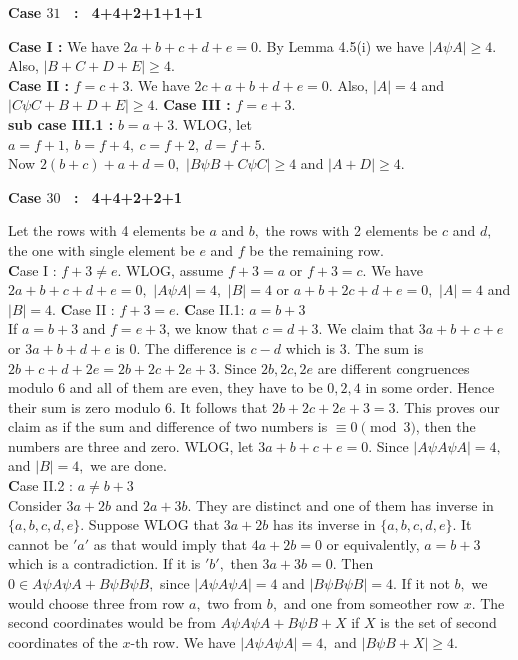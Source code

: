 \documentclass[reqno,10pt]{amsart}
\begin{document}
\begin{center}
 \textbf{Case $31$ \ : \ 4+4+2+1+1+1}
 \end{center}
\textbf {Case I : } We have $2a+b+c+d+e = 0.$ By Lemma 4.5(i) we have
$|A\psi A| \geq 4.$ Also, $|B+C+D+E| \geq 4.$\\
\textbf {Case II : } $f=c+3.$ We have $2c+a+b+d+e=0.$ Also, $|A|=4$ and
$|C\psi C+B+D+E| \geq 4.$
\textbf {Case III : } $f=e+3.$\\
\textbf{sub case III.1 :} $b=a+3.$ WLOG, let $a=f+1, \ b= f+4, \ c=f+2, \ d=f+5.$\\
Now $2(b+c)+a+d =0,$ $|B \psi B + C \psi C| \geq 4$ and $|A+D| \geq 4.$
\\
\begin{center}
\textbf{Case $30$ \ : \ 4+4+2+2+1}
\end{center}
Let  the rows with 4 elements be $a$ and $b,$ the rows with 2 elements be $c$ and $d,$ the one with single element be $e$ and $f$ be the remaining row.\\ 
{\textbf Case I : $f+3 \neq e$.}
WLOG, assume $f+3=a$ or $f+3=c.$ We have $2a+b+c+d+e=0,$ $|A \psi A| = 4,$ $|B|=4$  or $a+b+2c+d+e=0,$ $|A|=4$ and $|B|=4.$ 
{\textbf Case II : $f+3=e.$} 
{\textbf Case II.1: $a=b+3$}\\
If $a=b+3$ and $f=e+3$, we know that $c=d+3$. We claim that $3a+b+c+e$ or $3a+b+d+e$ is $0.$ The difference  is $c-d$ which is 3. The sum is $2b+c+d+2e=2b+2c+2e+3$. Since $2b, 2c, 2e$ are different congruences modulo 6 and all of them are even, they have to be $0, 2, 4$ in some order. Hence their sum is zero modulo 6. It follows that $2b+2c+2e+3 = 3.$ This proves our claim as if the sum and difference of two numbers is $\equiv 0 \pmod{3}$, then the numbers are three and zero.
WLOG, let $3a+b+c+e = 0.$ Since $|A\psi A\psi A| =4,$ and $|B|=4,$ we are done.\\
{\textbf Case II.2 : $a \neq b+3$}\\
Consider $3a+2b$ and $2a+3b.$ They are distinct and one of them has inverse in $\lbrace a,b,c,d,e \rbrace.$ Suppose WLOG that $3a+2b$ has its inverse in $\lbrace a,b,c,d,e \rbrace.$ It cannot be $'a'$ as that would imply that $4a+2b=0$ or equivalently, $a=b+3$ which is a contradiction. If it is $'b',$ then $3a+3b=0.$ Then $ 0 \in A \psi A\psi A+B\psi B\psi B,$ since $|A\psi A\psi A| = 4$ and $|B\psi B\psi B| = 4.$  If it not $b,$ we would choose three from row $a,$ two from $b,$ and one from someother row $x.$
The second coordinates would be from $A \psi A\psi A+B\psi B+ X$ if $X$ is the set of second coordinates of the $x$-th row. We have $|A\psi A\psi A|=4,$ and $|B\psi B+X| \geq 4.$ 
\end{document}
